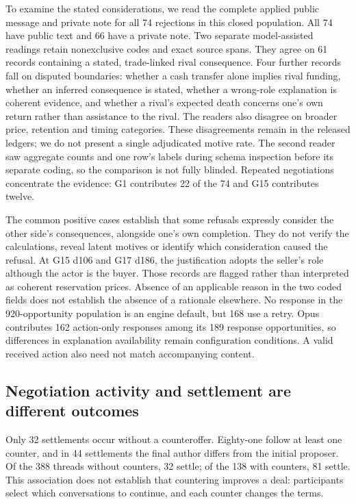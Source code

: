 To examine the stated considerations, we read the complete applied public
message and private note for all 74 rejections in this closed population.
All 74 have public text and 66 have a private note. Two separate model-assisted
readings retain nonexclusive codes and exact source spans. They agree on 61
records containing a stated, trade-linked rival consequence. Four further
records fall on disputed boundaries: whether a cash transfer alone implies
rival funding, whether an inferred consequence is stated, whether a wrong-role
explanation is coherent evidence, and whether a rival's expected death concerns
one's own return rather than assistance to the rival. The readers also disagree
on broader price, retention and timing categories. These disagreements remain
in the released ledgers; we do not present a single adjudicated motive rate.
The second reader saw aggregate counts and one row's labels during schema
inspection before its separate coding, so the comparison is not fully blinded.
Repeated negotiations concentrate the evidence: G1 contributes 22 of the 74
and G15 contributes twelve.

The common positive cases establish that some refusals expressly consider the
other side's consequences, alongside one's own completion. They do not verify
the calculations, reveal latent motives or identify which consideration caused
the refusal. At G15 d106 and G17 d186, the justification adopts the seller's
role although the actor is the buyer. Those records are flagged rather than
interpreted as coherent reservation prices. Absence of an applicable reason in
the two coded fields does not establish the absence of a rationale elsewhere.
No response in the 920-opportunity population is an engine default, but 168
use a retry. Opus contributes 162 action-only responses among its 189 response
opportunities, so differences in explanation availability remain configuration
conditions. A valid received action also need not match accompanying content.

\subsection{Negotiation activity and settlement are different outcomes}
\label{sec:agenda-negotiation-outcomes}

Only 32 settlements occur without a counteroffer. Eighty-one follow at least
one counter, and in 44 settlements the final author differs from the initial
proposer. Of the 388 threads without counters, 32 settle; of the 138 with
counters, 81 settle. This association does not establish that countering
improves a deal: participants select which conversations to continue, and each
counter changes the terms.

